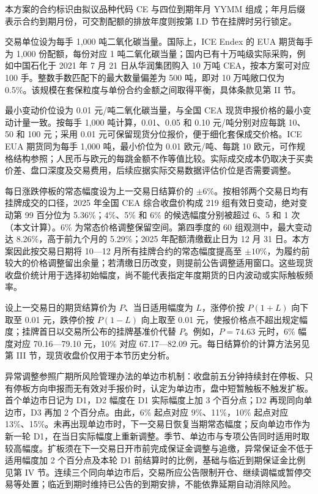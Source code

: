 \documentclass[UTF8,a4paper,11pt,oneside,fontset=fandol]{ctexart}
\begin{document}
\normalsize

本方案的合约标识由拟议品种代码 CE 与四位到期年月 YYMM 组成；年月后缀表示合约到期月份，可交割配额的排放年度则按第 I.D 节在挂牌时另行锁定。

交易单位设为每手 1,000 吨二氧化碳当量。国际上，ICE Endex 的 EUA 期货每手为 1,000 份配额，每份对应 1 吨二氧化碳当量\cite{iceEuaSpecs}；国内已有十万吨级实际采购，例如中国石化于 2021 年 7 月 21 日从华润集团购入 10 万吨 CEA\cite{sinopec2021bulk}，按本方案可对应 100 手。整数手数匹配下的最大数量偏差为 500 吨，即对 10 万吨敞口仅为 0.5\%。该规模在套保粒度与单份合约金额之间取得平衡，具体条款见第 II 节。


最小变动价位设为 0.01 元/吨二氧化碳当量，与全国 CEA 现货申报价格的最小变动计量一致\cite{mee2021trade}。按每手 1,000 吨计算，0.01、0.05 和 0.10 元/吨分别对应每跳 10、50 和 100 元；采用 0.01 元可保留现货分位报价，便于细化套保成交价格。ICE EUA 期货同为每手 1,000 吨，最小价位为 0.01 欧元/吨、每跳 10 欧元\cite{iceEuaSpecs}，可作规格结构参照；人民币与欧元的每跳金额不作等值比较。实际成交成本仍取决于买卖价差、盘口深度及交易费用，后续应据实际交易数据评估价位是否需要调整。


每日涨跌停板的常态幅度设为上一交易日结算价的 $\pm6\%$。按相邻两个交易日均有挂牌成交的口径，2025 年全国 CEA 综合收盘价构成 219 组有效日变动，绝对变动第 99 百分位为 5.36\%；4\%、5\% 和 6\% 的候选幅度分别被超过 6、5 和 1 次\cite{she2025daily}（本文计算）。6\% 为常态价格调整保留空间。第四季度的 60 组观测中，最大变动达 8.26\%，高于前九个月的 5.29\%；2025 年配额清缴截止日为 12 月 31 日\cite{mee2025work}。本方案因此按交易日期将 10—12 月所有挂牌合约的常态幅度提高至 $\pm10\%$，为履约前较大的价格调整留出余量；若清缴日历改变，则提前公告调整适用窗口。这些现货收盘价统计用于选择初始幅度，尚不能代表指定年度期货的日内波动或实际触板频率。

设上一交易日的期货结算价为 $P$、当日适用幅度为 $L$，涨停价按 $P(1+L)$ 向下取至 0.01 元，跌停价按 $P(1-L)$ 向上取至 0.01 元，使报价格点不超出规定幅度；挂牌首日以交易所公布的挂牌基准价代替 $P$。例如，$P=74.63$ 元时，6\% 幅度对应 70.16—79.10 元，10\% 对应 67.17—82.09 元。每日结算价的计算方法另见第 III 节，现货收盘价仅用于本节历史分析。

异常调整参照广期所风险管理办法的单边市机制\cite{gfexRisk2022reprint}：收盘前五分钟持续封在停板、只有停板方向申报而无有效对手报价时，认定为单边市，盘中短暂触板不触发扩板。首个单边市日记为 D1，D2 幅度在 D1 实际幅度上加 3 个百分点；D2 再现同向单边市，D3 再加 2 个百分点。由此，6\% 起点对应 9\%、11\%，10\% 起点对应 13\%、15\%。未再出现单边市时，下一交易日恢复当期常态幅度；反向单边市作为新一轮 D1，在当日实际幅度上重新调整。季节、单边市与专项公告同时适用时取较高幅度。扩板须在下一交易日开市前完成保证金调整与追缴，异常保证金不低于适用幅度加 2 个百分点及本轮 D1 前结算时的比例，基础与临近到期保证金比例见第 IV 节。连续三个同向单边市后，交易所应公告限制开仓、继续调幅或暂停交易等处置；临近到期时维持已公告的到期安排，不能依靠延期自动消除风险。
\end{document}
